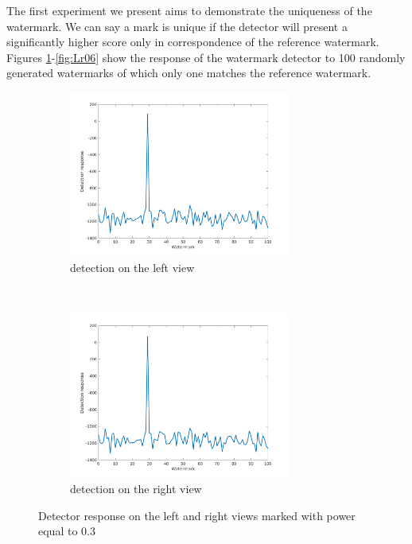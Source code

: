 The first experiment we present aims to demonstrate the uniqueness of the watermark. We can say a mark is unique if the detector will present a significantly higher score only in correspondence of the reference watermark. Figures \ref{fig:Ll03}-\ref{fig:Lr06} show the response of the watermark detector to 100 randomly generated watermarks of which only one matches the reference watermark.  
\begin{figure}[h!]
    \centering
    \begin{subfigure}[t]{0.5\textwidth}
        \centering
       \includegraphics[width=0.8\textwidth]{./img/likelihood/correct_LikelihoodL_03.png}
          \caption{\small{detection on the left view}}
          \label{fig:Ll03}

    \end{subfigure}%
    ~ 
    \begin{subfigure}[t]{0.5\textwidth}
        \centering
        \includegraphics[width=0.8\textwidth]{./img/likelihood/correct_LikelihoodLr_03.png}
           \caption{\small{detection on the right view}}
           \label{fig:Lr03}
    \end{subfigure}
    \caption{Detector response on the left and right views marked with power equal to 0.3}
\end{figure}


